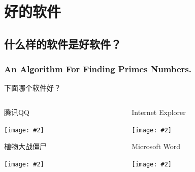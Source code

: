 
\section{好的软件}

\subsection[什么是好软件]{什么样的软件是好软件？}

\begin{frame}[fragile]
\frametitle{An Algorithm For Finding Primes Numbers.}
\begin{semiverbatim}
\end{semiverbatim}
\end{frame}

\newenvironment{iconblock}[2]{
    \begin{block}{#1}
    \begin{center}
    \texttt{[image: \#2]}}
{\end{center}
    \end{block}
}

\begin{frame}{下面哪个软件好？}
  \begin{columns}[T]
    \begin{column}{4cm}
      \begin{iconblock}{腾讯QQ}{qq.jpg}\end{iconblock}
      \begin{iconblock}{植物大战僵尸}{pvz.jpg}\end{iconblock}
    \end{column}
    \begin{column}{4cm}
      \begin{iconblock}{Internet Explorer}{ie.png}\end{iconblock}
      \begin{iconblock}{Microsoft Word}{word.png}\end{iconblock}
    \end{column}
  \end{columns}

\end{frame}

